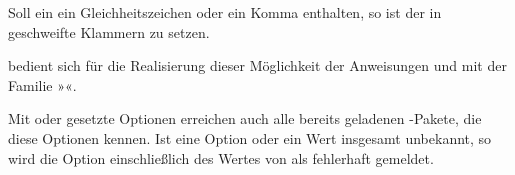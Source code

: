 Soll ein  ein Gleichheitszeichen oder ein Komma
enthalten, so ist der  in geschweifte Klammern zu setzen.

\begin{Explain}
  \KOMAScript{} bedient sich für die Realisierung dieser Möglichkeit der
  Anweisungen  und
   mit der Familie »«.
\end{Explain}

Mit  oder  gesetzte Optionen erreichen
auch
alle bereits geladenen \KOMAScript-Pakete, die diese Optionen kennen. Ist eine
Option oder ein Wert insgesamt unbekannt, so wird die Option einschließlich
des Wertes von
\hyperref[cha:scrbase]{}%
 als fehlerhaft
gemeldet.%
%
\iffalse%
\iffree{}{\IfThisCommonLabelBase{scrlayer-scrpage}{\par
    Das als veraltet zu betrachtende Paket
    \Package{scrpage2}\IndexPackage{scrpage2}\important{\Package{scrpage2}}
    besitzt diese Erweiterung übrigens nicht. Optionen können daher nur über
    die zuvor erklärte Möglichkeit während des Ladens des Pakets gesetzt
    werden.}{}}%
\fi%
\EndIndexGroup
%
\EndIndexGroup

\label{sec:\ThisCommonLabelBase.options.end}
\endinput

